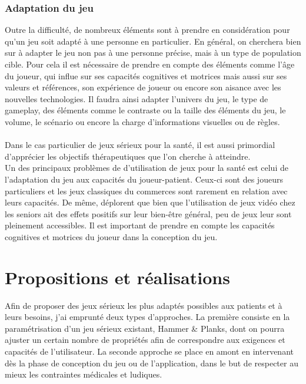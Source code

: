 \documentclass[french, 12pt]{article} %
\begin{document}
		\subsubsection{Adaptation du jeu}
Outre la difficulté, de nombreux éléments sont à prendre en considération pour qu'un jeu soit adapté à une personne en particulier. En général, on cherchera bien sur à adapter le jeu non pas à une personne précise, mais à un type de population cible. Pour cela il est nécessaire de prendre en compte des éléments comme l'âge du joueur, qui influe sur ses capacités cognitives et motrices mais aussi sur ses valeurs et références, son expérience de joueur ou encore son aisance avec les nouvelles technologies. Il faudra ainsi adapter l'univers du jeu, le type de gameplay, des éléments comme le contraste ou la taille des éléments du jeu, le volume, le scénario ou encore la charge d'informations visuelles ou de règles.
\paragraph{}Dans le cas particulier de jeux sérieux pour la santé, il est aussi primordial d'apprécier les objectifs thérapeutiques que l'on cherche à atteindre.\\
Un des principaux problèmes de d'utilisation de jeux pour la santé est celui de l'adaptation du jeu aux capacités du joueur-patient\cite{Flor08}. Ceux-ci sont des joueurs particuliers et les jeux classiques du commerces sont rarement en relation avec leurs
capacités.
De même, \cite{Gerl11} déplorent que bien que l'utilisation de jeux vidéo chez les seniors ait des effets positifs sur leur bien-être général, peu de jeux leur sont pleinement accessibles. Il est important de prendre en compte les capacités cognitives et motrices du joueur dans la conception du jeu.

\section{Propositions et réalisations}
Afin de proposer des jeux sérieux les plus adaptés possibles aux patients et à leurs besoins, j'ai emprunté deux types d'approches. La première consiste en la paramétrisation d'un jeu sérieux existant, Hammer \& Planks, dont on pourra ajuster un certain nombre de propriétés afin de correspondre aux exigences et capacités de l'utilisateur. La seconde approche se place en amont en intervenant dès la phase de conception du jeu ou de l'application, dans le but de respecter au mieux les contraintes médicales et ludiques.
\end{document}
